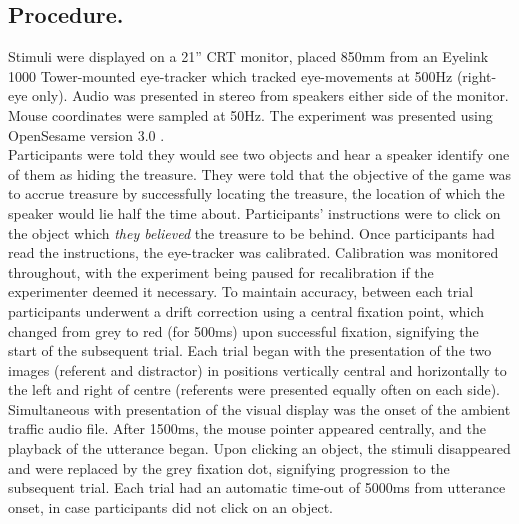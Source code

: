 \documentclass[a4paper,man,natbib]{apa6}
\begin{document}
\subsection{Procedure.}
Stimuli were displayed on a 21'' CRT monitor, placed 850mm from an Eyelink 1000 Tower-mounted eye-tracker which tracked eye-movements at 500Hz (right-eye only). 
Audio was presented in stereo from speakers either side of the monitor. 
Mouse coordinates were sampled at 50Hz. 
The experiment was presented using OpenSesame version 3.0 \citep{Mathot2012}.\\

Participants were told they would see two objects and hear a speaker identify one of them as hiding the treasure. 
They were told that the objective of the game was to accrue treasure by successfully locating the treasure, the location of which the speaker would lie half the time about. Participants' instructions were to click on the object which \textit{they believed} the treasure to be behind. 
Once participants had read the instructions, the eye-tracker was calibrated.
Calibration was monitored throughout, with the experiment being paused for recalibration if the experimenter deemed it necessary.
To maintain accuracy, between each trial participants underwent a drift correction using a central fixation point, which changed from grey to red (for 500ms) upon successful fixation, signifying the start of the subsequent trial. 
Each trial began with the presentation of the two images (referent and distractor) in positions vertically central and horizontally to the left and right of centre (referents were presented equally often on each side). 
Simultaneous with presentation of the visual display was the onset of the ambient traffic audio file. 
After 1500ms, the mouse pointer appeared centrally, and the playback of the utterance began. 
Upon clicking an object, the stimuli disappeared and were replaced by the grey fixation dot, signifying progression to the subsequent trial. 
Each trial had an automatic time-out of 5000ms from utterance onset, in case participants did not click on an object.\\
\end{document}
